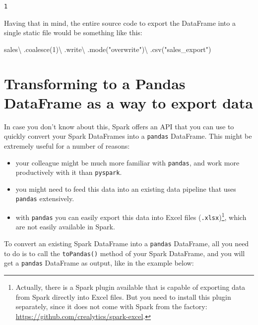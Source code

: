\documentclass[
  11pt,
  letterpaper,
  DIV=11,
  numbers=noendperiod]{scrreprt}
\newenvironment{Shaded}{\begin{snugshade}}{\end{snugshade}}
\newcommand{\DecValTok}[1]{\textcolor[rgb]{0.68,0.00,0.00}{#1}}
\newcommand{\NormalTok}[1]{\textcolor[rgb]{0.00,0.23,0.31}{#1}}
\newcommand{\OperatorTok}[1]{\textcolor[rgb]{0.37,0.37,0.37}{#1}}
\newcommand{\StringTok}[1]{\textcolor[rgb]{0.13,0.47,0.30}{#1}}
\providecommand{\tightlist}{%
  \setlength{\itemsep}{0pt}\setlength{\parskip}{0pt}}\usepackage{longtable,booktabs,array}
\begin{document}
\begin{verbatim}
1
\end{verbatim}

Having that in mind, the entire source code to export the DataFrame into
a single static file would be something like this:

\begin{Shaded}
\begin{Highlighting}[]
\NormalTok{sales}\OperatorTok{\textbackslash{}}
\NormalTok{    .coalesce(}\DecValTok{1}\NormalTok{)}\OperatorTok{\textbackslash{}}
\NormalTok{    .write}\OperatorTok{\textbackslash{}}
\NormalTok{    .mode(}\StringTok{"overwrite"}\NormalTok{)}\OperatorTok{\textbackslash{}}
\NormalTok{    .csv(}\StringTok{"sales\_export"}\NormalTok{)}
\end{Highlighting}
\end{Shaded}

\hypertarget{transforming-to-a-pandas-dataframe-as-a-way-to-export-data}{%
\section{Transforming to a Pandas DataFrame as a way to export
data}\label{transforming-to-a-pandas-dataframe-as-a-way-to-export-data}}

In case you don't know about this, Spark offers an API that you can use
to quickly convert your Spark DataFrames into a \texttt{pandas}
DataFrame. This might be extremely useful for a number of reasons:

\begin{itemize}
\tightlist
\item
  your colleague might be much more familiar with \texttt{pandas}, and
  work more productively with it than \texttt{pyspark}.
\item
  you might need to feed this data into an existing data pipeline that
  uses \texttt{pandas} extensively.
\item
  with \texttt{pandas} you can easily export this data into Excel files
  (\texttt{.xlsx})\footnote{Actually, there is a Spark plugin available
    that is capable of exporting data from Spark directly into Excel
    files. But you need to install this plugin separately, since it does
    not come with Spark from the factory:
    \url{https://github.com/crealytics/spark-excel}.}, which are not
  easily available in Spark.
\end{itemize}

To convert an existing Spark DataFrame into a \texttt{pandas} DataFrame,
all you need to do is to call the \texttt{toPandas()} method of your
Spark DataFrame, and you will get a \texttt{pandas} DataFrame as output,
like in the example below:
\end{document}
